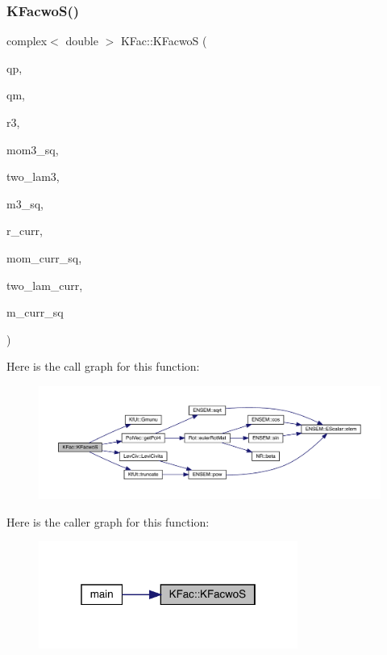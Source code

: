 \subsubsection{\texorpdfstring{KFacwoS()}{KFacwoS()}}
{\footnotesize\ttfamily complex$<$ double $>$ K\+Fac\+::\+K\+FacwoS (\begin{DoxyParamCaption}\item[{Eigen\+::\+Vector\+Xd \&}]{qp,  }\item[{Eigen\+::\+Vector\+Xd \&}]{qm,  }\item[{std\+::vector$<$ double $>$ \&}]{r3,  }\item[{double \&}]{mom3\+\_\+sq,  }\item[{const int \&}]{two\+\_\+lam3,  }\item[{double \&}]{m3\+\_\+sq,  }\item[{std\+::vector$<$ double $>$ \&}]{r\+\_\+curr,  }\item[{double \&}]{mom\+\_\+curr\+\_\+sq,  }\item[{const int \&}]{two\+\_\+lam\+\_\+curr,  }\item[{double \&}]{m\+\_\+curr\+\_\+sq }\end{DoxyParamCaption})}

Here is the call graph for this function\+:
\nopagebreak
\begin{figure}[H]
\begin{center}
\leavevmode
\includegraphics[width=350pt]{d2/d89/namespaceKFac_a2f18ad8b36ac24cc9534755cccb8c780_cgraph}
\end{center}
\end{figure}
Here is the caller graph for this function\+:\nopagebreak
\begin{figure}[H]
\begin{center}
\leavevmode
\includegraphics[width=241pt]{d2/d89/namespaceKFac_a2f18ad8b36ac24cc9534755cccb8c780_icgraph}
\end{center}
\end{figure}
\mbox{\label{namespaceKFac_a2ae9d69821729f6946651703e8990e58}} 
